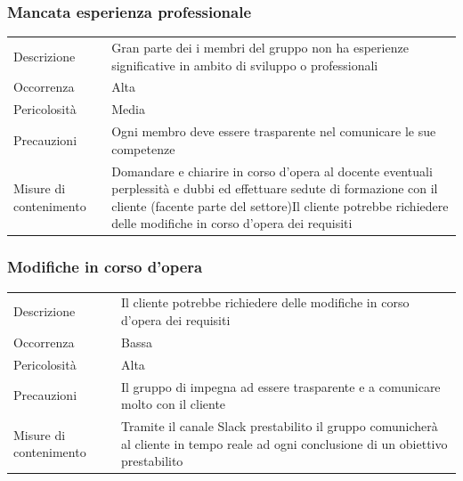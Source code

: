 \documentclass{article}
\begin{document}
\subsubsection{Mancata esperienza professionale}
\begin{center}
\begin{tabular}{P{10em} P{20em}} 
     Descrizione & Gran parte dei i membri del gruppo non ha esperienze significative in ambito di sviluppo o professionali\\ 
    Occorrenza & Alta\\
    Pericolosità & Media \\
    Precauzioni & Ogni membro deve essere trasparente nel comunicare le sue competenze \\
    Misure di contenimento & Domandare e chiarire in corso d'opera al docente eventuali perplessità e dubbi ed effettuare sedute di formazione con il cliente (facente parte del settore)Il cliente potrebbe richiedere delle modifiche in corso d'opera dei requisiti 
 \\
\end{tabular}
\label{tab:espprof}
\end{center}

\subsubsection{Modifiche in corso d'opera}
\begin{center}
\begin{tabular}{P{10em} P{20em}} 
     Descrizione & Il cliente potrebbe richiedere delle modifiche in corso d'opera dei requisiti\\ 
    Occorrenza & Bassa\\
    Pericolosità & Alta \\
    Precauzioni & Il gruppo di impegna ad essere trasparente e a comunicare molto con il cliente \\
    Misure di contenimento & Tramite il canale Slack prestabilito il gruppo comunicherà al cliente in tempo reale ad ogni conclusione di un obiettivo prestabilito \\
\end{tabular}
\label{tab:modifiche}
\end{center}
\end{document}
